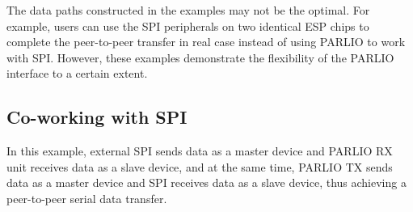 \documentclass[main\_\_EN.tex]{subfiles}
\begin{document}
\begin{tiplisting}
The data paths constructed in the examples may not be the optimal. For example, users can use the SPI peripherals on two identical ESP chips to complete the peer-to-peer transfer in real case instead of using PARLIO to work with SPI. However, these examples demonstrate the flexibility of the PARLIO interface to a certain extent.
\end{tiplisting}

\subsection{Co-working with SPI}

In this example, external SPI sends data as a master device and PARLIO RX unit receives data as a slave device, and at the same time, PARLIO TX sends data as a master device and SPI receives data as a slave device, thus achieving a peer-to-peer serial data transfer. 
\end{document}
